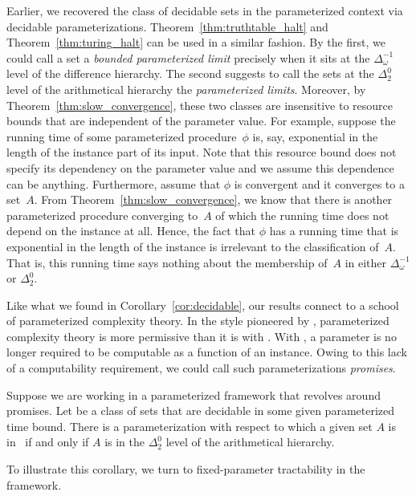 Earlier, we recovered the class of decidable sets in the parameterized context via decidable parameterizations.
Theorem~\ref{thm:truthtable_halt} and Theorem~\ref{thm:turing_halt} can be used in a similar fashion.
By the first, we could call a set a \emph{bounded parameterized limit} precisely when it sits at the $\Delta^{-1}_\omega$ level of the difference hierarchy.
The second suggests to call the sets at the $\Delta^0_2$ level of the arithmetical hierarchy the \emph{parameterized limits}.
Moreover, by Theorem~\ref{thm:slow_convergence}, these two classes are insensitive to resource bounds that are independent of the parameter value.
For example, suppose the running time of some parameterized procedure~$\phi$ is, say, exponential in the length of the instance part of its input.
Note that this resource bound does not specify its dependency on the parameter value and we assume this dependence can be anything.
Furthermore, assume that $\phi$ is convergent and it converges to a set~$A$.
From Theorem~\ref{thm:slow_convergence}, we know that there is another parameterized procedure converging to~$A$ of which the running time does not depend on the instance at all.
Hence, the fact that $\phi$ has a running time that is exponential in the length of the instance is irrelevant to the classification of~$A$.
That is, this running time says nothing about the membership of~$A$ in either $\Delta^{-1}_\omega$ or $\Delta^0_2$.

Like what we found in Corollary~\ref{cor:decidable}, our results connect to a school of parameterized complexity theory.
In the style pioneered by \textcite{downey1999parameterized}, parameterized complexity theory is more permissive than it is with \textcite{flum2006parameterized}.
With \citeauthor{downey1999parameterized}, a parameter is no longer required to be computable as a function of an instance.
Owing to this lack of a computability requirement, we could call such parameterizations \emph{promises}.
\begin{corollary}
\label{cor:delta2}%
  Suppose we are working in a parameterized framework that revolves around promises.
  Let  be a class of sets that are decidable in some given parameterized time bound.
  There is a parameterization with respect to which a given set $A$ is in~ if and only if $A$ is in the $\Delta^0_2$ level of the arithmetical hierarchy.
\end{corollary}

To illustrate this corollary, we turn to fixed-parameter tractability in the \citeauthor{downey1999parameterized} framework.


